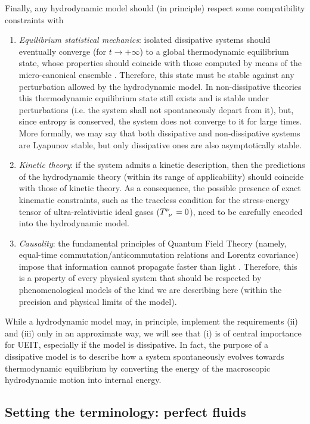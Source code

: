 \documentclass[a4paper, amsfonts, amssymb, amsmath, reprint, twocolumn, showkeys, nofootinbib]{revtex4-2}
\begin{document}
Finally,  any hydrodynamic model should (in principle) respect some compatibility constraints with
\begin{enumerate}
%
\item[i-] \textit{Equilibrium statistical mechanics}: isolated dissipative systems should eventually converge (for $t \longrightarrow +\infty$) to a global thermodynamic equilibrium state, whose properties should coincide with those computed by means of the micro-canonical ensemble \citep{huang_book}. Therefore, this state must be stable against any perturbation allowed by the hydrodynamic model. In non-dissipative theories this thermodynamic equilibrium state still exists and is stable under perturbations (i.e. the system shall not spontaneously depart from it), but, since entropy is conserved, the system does not converge to it for large times. More formally, we may say that both dissipative and non-dissipative systems are Lyapunov stable, but only dissipative ones are also asymptotically stable.
%
\item[ii-] \textit{Kinetic theory}: if the system admits a kinetic description, then the predictions of the hydrodynamic theory (within its range of applicability) should coincide with those of kinetic theory. 
As a consequence, the possible presence of exact kinematic constraints, such as the traceless condition for the stress-energy tensor of ultra-relativistic ideal gases ($T\indices{^\nu _\nu}=0$), need to be carefully encoded into  the hydrodynamic model. 
%
\item[iii-] \textit{Causality}: the fundamental principles of Quantum Field Theory (namely, equal-time commutation/anticommutation relations and Lorentz covariance) impose that information cannot propagate faster than light \citep{Peskin_book}. Therefore, this is a property of every physical system that should be respected by phenomenological models of the kind we are describing here 
(within the precision and physical limits of the model). 
\end{enumerate}
%
While a hydrodynamic model may, in principle, implement the requirements (ii) and (iii) only in an approximate way, we will see that (i) is of central importance for UEIT, especially if the model is  dissipative. In fact, the purpose of a dissipative model is to describe how a system spontaneously evolves towards thermodynamic equilibrium by converting the energy of the macroscopic hydrodynamic motion into internal energy.

\subsection{Setting the terminology: perfect fluids}\label{perflabgeulftssa}
\end{document}
